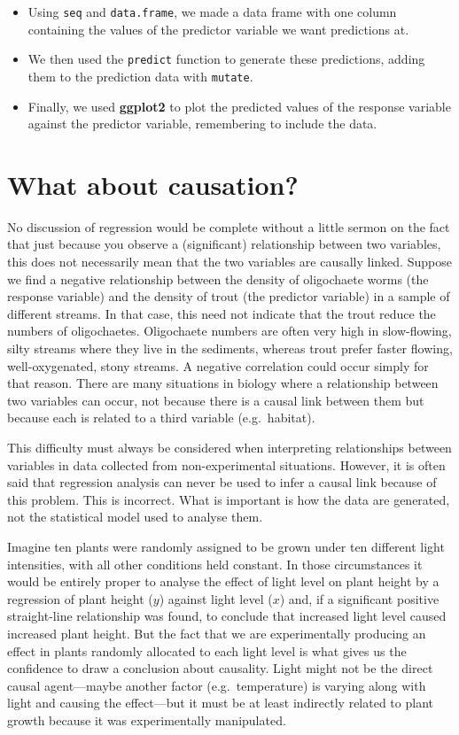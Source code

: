 \documentclass[
]{book}
\providecommand{\tightlist}{%
  \setlength{\itemsep}{0pt}\setlength{\parskip}{0pt}}
\begin{document}
\begin{itemize}
\tightlist
\item
  Using \texttt{seq} and \texttt{data.frame}, we made a data frame with one column containing the values of the predictor variable we want predictions at.
\item
  We then used the \texttt{predict} function to generate these predictions, adding them to the prediction data with \texttt{mutate}.
\item
  Finally, we used \textbf{ggplot2} to plot the predicted values of the response variable against the predictor variable, remembering to include the data.
\end{itemize}

\hypertarget{regression-causation}{%
\section{What about causation?}\label{regression-causation}}

No discussion of regression would be complete without a little sermon on the fact that just because you observe a (significant) relationship between two variables, this does not necessarily mean that the two variables are causally linked. Suppose we find a negative relationship between the density of oligochaete worms (the response variable) and the density of trout (the predictor variable) in a sample of different streams. In that case, this need not indicate that the trout reduce the numbers of oligochaetes. Oligochaete numbers are often very high in slow-flowing, silty streams where they live in the sediments, whereas trout prefer faster flowing, well-oxygenated, stony streams. A negative correlation could occur simply for that reason. There are many situations in biology where a relationship between two variables can occur, not because there is a causal link between them but because each is related to a third variable (e.g.~habitat).

This difficulty must always be considered when interpreting relationships between variables in data collected from non-experimental situations. However, it is often said that regression analysis can never be used to infer a causal link because of this problem. This is incorrect. What is important is how the data are generated, not the statistical model used to analyse them.

Imagine ten plants were randomly assigned to be grown under ten different light intensities, with all other conditions held constant. In those circumstances it would be entirely proper to analyse the effect of light level on plant height by a regression of plant height (\(y\)) against light level (\(x\)) and, if a significant positive straight-line relationship was found, to conclude that increased light level caused increased plant height. But the fact that we are experimentally producing an effect in plants randomly allocated to each light level is what gives us the confidence to draw a conclusion about causality. Light might not be the direct causal agent---maybe another factor (e.g.~temperature) is varying along with light and causing the effect---but it must be at least indirectly related to plant growth because it was experimentally manipulated.
\end{document}
